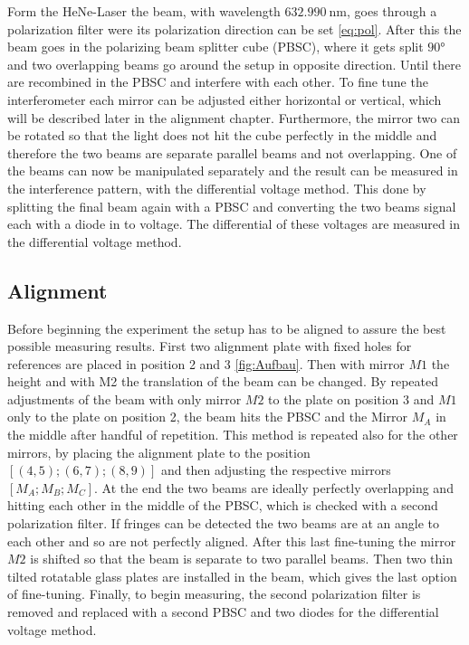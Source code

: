 Form the HeNe-Laser the beam, with wavelength $\qty{632.990}{\nano\meter}$,
goes through a polarization filter were its polarization direction can be set
\eqref{eq:pol}. After this the beam goes in the polarizing beam splitter cube
(PBSC), where it gets split $90°$ and two overlapping beams go around the setup
in opposite direction. Until there are recombined in the PBSC and interfere
with each other. To fine tune the interferometer each mirror can be adjusted
either horizontal or vertical, which will be described later in the alignment
chapter. Furthermore, the mirror two can be rotated so that the light does not
hit the cube perfectly in the middle and therefore the two beams are separate
parallel beams and not overlapping. One of the beams can now be manipulated
separately and the result can be measured in the interference pattern, with the
differential voltage method. This done by splitting the final beam again with a
PBSC and converting the two beams signal each with a diode in to voltage. The
differential of these voltages are measured in the differential voltage method.

\subsection{Alignment}
Before beginning the experiment the setup has to be aligned to assure the best
possible measuring results. First two alignment plate with fixed holes for
references are placed in position 2 and 3 \eqref{fig:Aufbau}. Then with mirror
$M1$ the height and with M2 the translation of the beam can be changed. By
repeated adjustments of the beam with only mirror $M2$ to the plate on position
3 and $M1$ only to the plate on position 2, the beam hits the PBSC and the
Mirror $M_A$ in the middle after handful of repetition. This method is repeated
also for the other mirrors, by placing the alignment plate to the position
$[(4,5);(6,7);(8,9)]$ and then adjusting the respective mirrors
$[M_A;M_B;M_C]$. At the end the two beams are ideally perfectly overlapping and
hitting each other in the middle of the PBSC, which is checked with a second
polarization filter. If fringes can be detected the two beams are at an angle
to each other and so are not perfectly aligned. After this last fine-tuning the
mirror $M2$ is shifted so that the beam is separate to two parallel beams. Then
two thin tilted rotatable glass plates are installed in the beam, which gives
the last option of fine-tuning. Finally, to begin measuring, the second
polarization filter is removed and replaced with a second PBSC and two diodes
for the differential voltage method.

